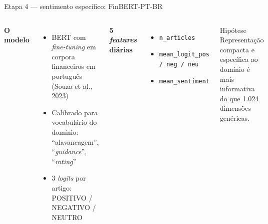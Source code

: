 \documentclass[11pt,aspectratio=169]{beamer}
\begin{document}
\begin{frame}{Etapa 4 --- sentimento específico: FinBERT-PT-BR}
  \begin{columns}[T]
    \textbf{O modelo}
    \begin{itemize}
      \item BERT com \textit{fine-tuning} em corpora financeiros em português (Souza et al., 2023)
      \item Calibrado para vocabulário do domínio: ``alavancagem'', ``\textit{guidance}'', ``\textit{rating}''
      \item 3 \textit{logits} por artigo: POSITIVO / NEGATIVO / NEUTRO
    \end{itemize}
    \textbf{5 \textit{features} diárias}
    \begin{itemize}
      \item \texttt{n\_articles}
      \item \texttt{mean\_logit\_pos / neg / neu}
      \item \texttt{mean\_sentiment}
    \end{itemize}
    \vspace{1ex}
    \begin{block}{Hipótese}
      Representação compacta e específica ao domínio é mais
      informativa do que 1.024 dimensões genéricas.
    \end{block}
  \end{columns}
\end{frame}
\end{document}
